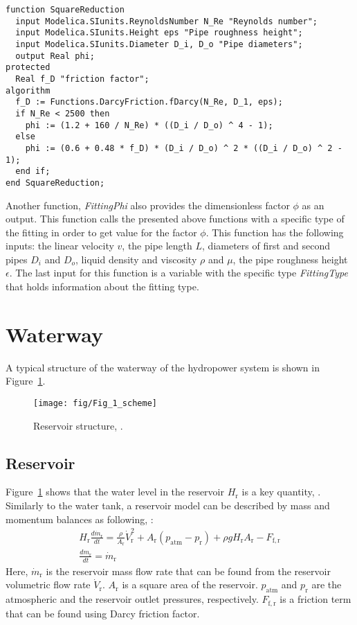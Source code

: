 \documentclass[%
]{USN-PhD}
\begin{document}
\begin{lstlisting}[language = modelica]
function SquareReduction
  input Modelica.SIunits.ReynoldsNumber N_Re "Reynolds number";
  input Modelica.SIunits.Height eps "Pipe roughness height";
  input Modelica.SIunits.Diameter D_i, D_o "Pipe diameters";
  output Real phi;
protected
  Real f_D "friction factor";
algorithm
  f_D := Functions.DarcyFriction.fDarcy(N_Re, D_1, eps);
  if N_Re < 2500 then
    phi := (1.2 + 160 / N_Re) * ((D_i / D_o) ^ 4 - 1);
  else
    phi := (0.6 + 0.48 * f_D) * (D_i / D_o) ^ 2 * ((D_i / D_o) ^ 2 - 1);
  end if;
end SquareReduction;
\end{lstlisting}

Another function, \emph{FittingPhi} also provides the dimensionless factor $\phi$ as an output. This function calls the presented above functions with a specific type of the fitting in order to get value for the factor $\phi$. This function has the following inputs: the linear velocity $v$, the pipe length $L$, diameters of first and second pipes $D_i$ and $D_o$, liquid density and viscosity $\rho$ and $\mu$, the pipe roughness height $\epsilon$. The last input for this function is a variable with the specific type \emph{FittingType} that holds information about the fitting type.

\section{Waterway}

A typical structure of the waterway of the hydropower system is shown in Figure~\ref{fig:fig7}.

\begin{figure}[!ht]
  \centering
 \texttt{[image: fig/Fig\_1\_scheme]}
 \caption{Reservoir structure, \cite{LieL:18}.}
  \label{fig:fig7}
\end{figure}

\subsection{Reservoir}

Figure~\ref{fig:fig7} shows that the water level in the reservoir $H_\mathrm{r}$ is a key quantity, \cite{Val:17}. Similarly to the water tank, a reservoir model can be described by mass and momentum balances as following, \cite{Sha:11}:
\begin{equation}
\begin{array}{c}
    H_\mathrm{r}\frac{d\dot{m}_\mathrm{r}}{dt}=\frac{\rho}{A_\mathrm{r}}\dot{V}_\mathrm{r}^2+A_\mathrm{r}\left(p_\mathrm{atm}-p_\mathrm{r}\right)+\rho gH_\mathrm{r}A_\mathrm{r}-F_\mathrm{f,r}\\
    \frac{dm_\mathrm{r}}{dt}=\dot{m}_\mathrm{r}
\end{array}
\end{equation}
Here, $\dot{m}_\mathrm{r}$ is the reservoir mass flow rate that can be found from the reservoir volumetric flow rate $\dot{V}_\mathrm{r}$. $A_\mathrm{r}$ is a square area of the reservoir. $p_\mathrm{atm}$ and $p_\mathrm{r}$ are the atmospheric and the reservoir outlet pressures, respectively. $F_\mathrm{f,r}$ is a friction term that can be found using Darcy friction factor.
\end{document}
